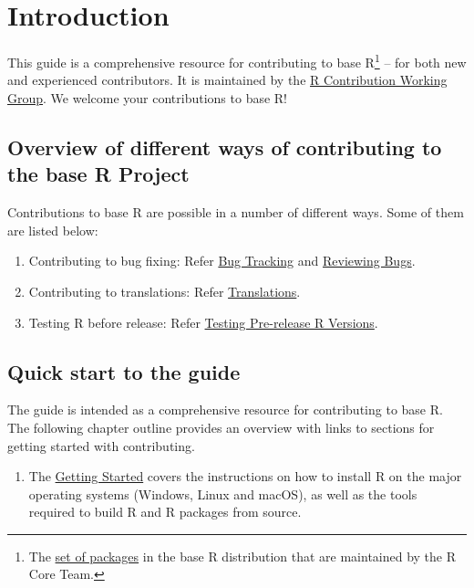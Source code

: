 \documentclass[
]{book}
\providecommand{\tightlist}{%
  \setlength{\itemsep}{0pt}\setlength{\parskip}{0pt}}
\begin{document}
\chapter{Introduction}\label{introduction}

This guide is a comprehensive resource for contributing to base R\footnote{The \href{https://cran.r-project.org/doc/FAQ/R-FAQ.html\#Add_002don-packages-in-R}{set of packages} in the base R distribution that are maintained by the R Core Team.} -- for both new and experienced contributors. It is maintained by the \href{/working-group}{R Contribution Working Group}. We welcome your contributions to base R!

\section{Overview of different ways of contributing to the base R Project}\label{overview-of-different-ways-of-contributing-to-the-base-r-project}

Contributions to base R are possible in a number of different ways. Some of them are listed below:

\begin{enumerate}
\def\labelenumi{\arabic{enumi}.}
\tightlist
\item
  Contributing to bug fixing: Refer \hyperref[BugTrack]{Bug Tracking} and \hyperref[ReviewBugs]{Reviewing Bugs}.
\item
  Contributing to translations: Refer \hyperref[]{Translations}.
\item
  Testing R before release: Refer \hyperref[TestRVer]{Testing Pre-release R Versions}.
\end{enumerate}

\section{Quick start to the guide}\label{quick-start-to-the-guide}

The guide is intended as a comprehensive resource for contributing to base R. The following chapter outline provides an overview with links to sections for getting started with contributing.

\begin{enumerate}
\def\labelenumi{\arabic{enumi}.}
\tightlist
\item
  The \hyperref[GetStart]{Getting Started} covers the instructions on how to install R on the major operating systems (Windows, Linux and macOS), as well as the tools required to build R and R packages from source.
\end{enumerate}
\end{document}
